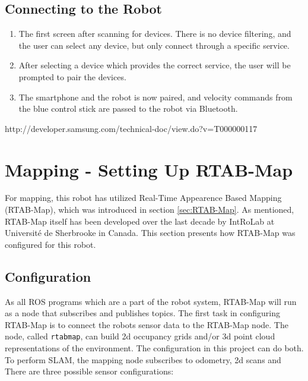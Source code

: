 \subsection{Connecting to the Robot}

\begin{enumerate}
	\item The first screen after scanning for devices. There is no device filtering, and the user can select any device, but only connect through a specific service.
	\item After selecting a device which provides the correct service, the user will be prompted to pair the devices.
	\item The smartphone and the robot is now paired, and velocity commands from the blue control stick are passed to the robot via Bluetooth.
\end{enumerate}

http://developer.samsung.com/technical-doc/view.do?v=T000000117



\section{Mapping - Setting Up RTAB-Map}

For mapping, this robot has utilized Real-Time Appearence Based Mapping (\ac{RTAB-Map}), which was introduced in section \ref{sec:RTAB-Map}. As mentioned, \ac{RTAB-Map} itself has been developed over the last decade by IntRoLab at Université de Sherbrooke in Canada. This section presents how \ac{RTAB-Map} was configured for this robot.

\subsection{Configuration}

As all \ac{ROS} programs which are a part of the robot system, \ac{RTAB-Map} will run as a node that subscribes and publishes topics. The first task in configuring \ac{RTAB-Map} is to connect the robots sensor data to the \ac{RTAB-Map} node. The node, called \texttt{rtabmap}, can build 2d occupancy grids and/or 3d point cloud representations of the environment. The configuration in this project can do both. To perform \ac{SLAM}, the mapping node subscribes to odometry, 2d scans and  There are three possible sensor configurations:




